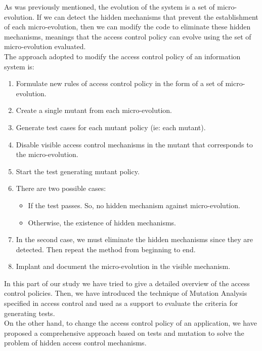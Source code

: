 \documentclass{acm_proc_article-sp}
\begin{document}
As was previously mentioned, the evolution of the system is a set of micro-evolution. If we can detect the hidden mechanisms that prevent the establishment of each micro-evolution, then we can modify the code to eliminate these hidden mechanisms, meanings that the access control policy can evolve using the set of micro-evolution evaluated.\\
The approach adopted to modify the access control policy of an information system is:
\begin{enumerate}
 \item Formulate new rules of access control policy in the form of a set of micro-evolution.
 \item Create a single mutant from each micro-evolution.
 \item Generate test cases for each mutant policy (ie: each mutant).
 \item Disable visible access control mechanisms in the mutant that corresponds to the micro-evolution.
 \item Start the test generating mutant policy.
 \item There are two possible cases:
 \begin{itemize}
  \item If the test passes. So, no hidden mechanism against micro-evolution.
  \item Otherwise, the existence of hidden mechanisms.
 \end{itemize}
 \item In the second case, we must eliminate the hidden mechanisms since they are detected. Then repeat the method from beginning to end.
 \item Implant and document the micro-evolution in the visible mechanism.
\end{enumerate}

In this part of our study we have tried to give a detailed overview of the access control policies. Then, we have introduced the technique of Mutation Analysis specified in access control and used as a support to evaluate the criteria for generating tests.\\
On the other hand, to change the access control policy of an application, we have proposed a comprehensive approach based on tests and mutation to solve the problem of hidden access control mechanisms.
\end{document}
